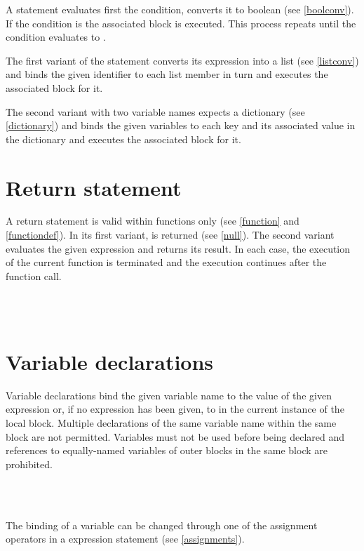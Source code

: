 \noindent
A  statement evaluates first the condition,
converts it to boolean (see \ref{boolconv}). If the condition
is  the associated block is executed. This process
repeats until the condition evaluates to .

The first variant of the  statement converts its
expression into a list (see \ref{listconv}) and binds the given identifier
to each list member in turn and executes the associated block for it.

The second variant with two variable names expects a dictionary
(see \ref{dictionary}) and binds the given variables to each
key and its associated value in the dictionary and executes the
associated block for it.

\section{Return statement}\label{return}

A return statement is valid within functions only (see \ref{function}
and \ref{functiondef}). In its first variant,  is
returned (see \ref{null}). The second variant evaluates the
given expression and returns its result. In each case, the
execution of the current function is terminated and the execution
continues after the function call.

\begin{grammar}
      \produces {} \\
      \produces {}  \\
\end{grammar}

\section{Variable declarations}\label{var}

Variable declarations bind the given variable name to the value of the
given expression or, if no expression has been given, to 
in the current instance of the local block. Multiple declarations of the
same variable name within the same block are not permitted. Variables
must not be used before being declared and references to equally-named
variables of outer blocks in the same block are prohibited.

\begin{grammar}
      \produces {}  \\
      \produces {} 
	 \lextoken{=}  \\
\end{grammar}

\noindent
The binding of a variable can be changed through one of the
assignment operators in a expression statement (see \ref{assignments}).

\endinput
